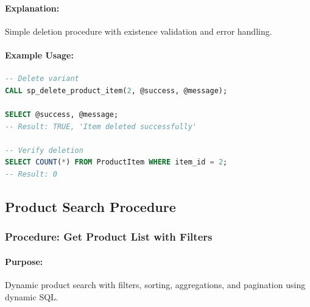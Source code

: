 \paragraph{Explanation:}
Simple deletion procedure with existence validation and error handling.

\paragraph{Example Usage:}

\begin{lstlisting}[language=SQL]
-- Delete variant
CALL sp_delete_product_item(2, @success, @message);

SELECT @success, @message;
-- Result: TRUE, 'Item deleted successfully'

-- Verify deletion
SELECT COUNT(*) FROM ProductItem WHERE item_id = 2;
-- Result: 0
\end{lstlisting}

\subsection{Product Search Procedure}

\subsubsection{Procedure: Get Product List with Filters}

\paragraph{Purpose:} Dynamic product search with filters, sorting, aggregations, and pagination using dynamic SQL.


